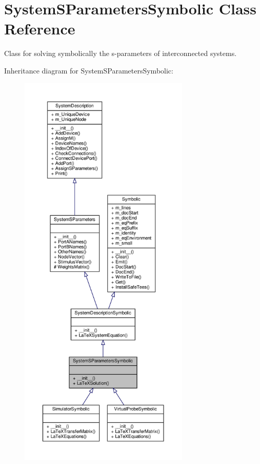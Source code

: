 \hypertarget{classSignalIntegrity_1_1SystemDescriptions_1_1SystemSParametersSymbolic_1_1SystemSParametersSymbolic}{}\section{System\+S\+Parameters\+Symbolic Class Reference}
\label{classSignalIntegrity_1_1SystemDescriptions_1_1SystemSParametersSymbolic_1_1SystemSParametersSymbolic}


Class for solving symbolically the s-\/parameters of interconnected systems.  




Inheritance diagram for System\+S\+Parameters\+Symbolic\+:\nopagebreak
\begin{figure}[H]
\begin{center}
\leavevmode
\includegraphics[height=550pt]{classSignalIntegrity_1_1SystemDescriptions_1_1SystemSParametersSymbolic_1_1SystemSParametersSymbolic__inherit__graph}
\end{center}
\end{figure}


